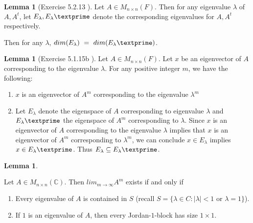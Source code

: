 \documentclass{amsart}
\theoremstyle{definition}
\newtheorem{lemma}[theorem]{Lemma}
\theoremstyle{remark}
\numberwithin{equation}{section}
\begin{document}
\begin{lemma}[Exercise 5.2.13 \cite{friedberg2003linear}]\label{exercise5213}
Let $A \in M_{n \times n}(F)$.
Then for any eigenvalue $\lambda$ of $A, A^t$, let $E_{\lambda}, E_{\lambda}\textprime$ denote the corresponding eigenvalues for $A, A^t$ respectively.


Then for any $\lambda$, $dim(E_{\lambda})\ =\  dim(E_{\lambda}\textprime)$.

\end{lemma}

\begin{lemma}[Exercise 5.1.15b \cite{friedberg2003linear}]\label{exercise5115}
Let $A \in M_{n \times n}(F)$.
Let $x$ be an eigenvector of $A$ corresponding to the eigenvalue $\lambda$.
For any positive integer $m$, we have the following:

\begin{enumerate}
	\item 
		$x$ is an eigenvector of $A^m$ corresponding to the eigenvalue $\lambda^m$

	\item 
		Let $E_{\lambda}$ denote the eigenspace of $A$ corresponding to eigenvalue $\lambda$ and $E_{\lambda}\textprime$ the eigenspace of $A^m$ corresponding to $\lambda$.
		Since $x$ is an eigenvector of $A$ corresponding to the eigenvalue $\lambda$ implies that $x$ is an eigenvector of $A^m$ corresponding to $\lambda^m$, we can conclude $x \in E_{\lambda}$ implies $x \in E_{\lambda}\textprime$.
		Thus $E_{\lambda} \subseteq E_{\lambda}\textprime$.

\end{enumerate}

\end{lemma}

\begin{lemma}\label{benstheorem1}

Let $A \in M_{n \times n}(\mathbb{C})$.
Then $lim_{m \to \infty}A^m$ exists if and only if

	\begin{enumerate}
		\item Every eigenvalue of $A$ is contained in $S$ (recall $S = \{ \lambda \in C: |\lambda| < 1$ or $\lambda = 1\}$).

		\item If $1$ is an eigenvalue of $A$, then every Jordan-$1$-block has size $1 \times 1$.


	\end{enumerate}

\end{lemma}
\end{document}

